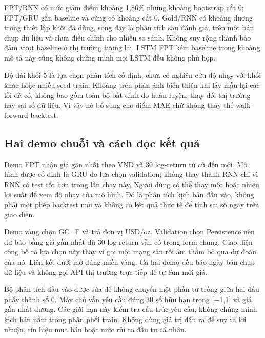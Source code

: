 FPT/RNN có mức giảm điểm khoảng 1,86\% nhưng khoảng bootstrap cắt 0;
FPT/GRU gần baseline và cũng có khoảng cắt 0. Gold/RNN có khoảng dương
trong thiết lập khối đã dùng, song đây là phân tích sau đánh giá, trên
một bản chụp dữ liệu và chưa điều chỉnh cho nhiều so sánh. Không suy rộng thành
bảo đảm vượt baseline ở thị trường tương lai. LSTM FPT kém baseline
trong khoảng mô tả này cũng không chứng minh mọi LSTM đều không phù hợp.

Độ dài khối 5 là lựa chọn phân tích cố định, chưa có nghiên cứu độ nhạy
với khối khác hoặc nhiều seed train. Khoảng trên phản ánh biến thiên khi
lấy mẫu lại các lỗi đã có, không bao gồm toàn bộ bất định do huấn luyện,
thay đổi thị trường hay sai số dữ liệu. Vì vậy nó bổ sung cho điểm MAE
chứ không thay thế walk-forward backtest.

\subsection{Hai demo chuỗi và cách đọc kết quả}\label{hai-demo-chuux1ed7i-vuxe0-cuxe1ch-ux111ux1ecdc-kux1ebft-quux1ea3}

Demo FPT nhận giá gần nhất theo VND và 30 log-return từ cũ đến mới. Mô
hình được cố định là GRU do lựa chọn validation; không thay thành RNN
chỉ vì RNN có test tốt hơn trong lần chạy này. Người dùng có thể thay
một hoặc nhiều lợi suất để xem độ nhạy của mô hình. Đó là phân tích kịch
bản đầu vào, không phải một phép backtest mới và không có kết quả thực
tế để tính sai số ngay trên giao diện.


Demo vàng chọn GC=F và trả đơn vị USD/oz. Validation chọn Persistence
nên dự báo bằng giá gần nhất dù 30 log-return vẫn có trong form chung.
Giao diện công bố rõ lựa chọn này thay vì gọi một mạng sâu rồi âm thầm
bỏ qua dự đoán của nó. Liên kết dưới mở đúng miền vàng. Cả hai demo đều
báo ngày bản chụp dữ liệu và không gọi API thị trường trực tiếp để tự làm mới
giá.


Bộ phân tích đầu vào được sửa để không chuyển một phần tử trống giữa hai
dấu phẩy thành số 0. Máy chủ vẫn yêu cầu đúng 30 số hữu hạn trong
{[}−1,1{]} và giá gần nhất dương. Các giới hạn này kiểm tra cấu trúc yêu
cầu, không chứng minh kịch bản nằm trong phân phối train. Không dùng giá
trị đầu ra để suy ra lợi nhuận, tín hiệu mua bán hoặc mức rủi ro đầu tư
cá nhân.

